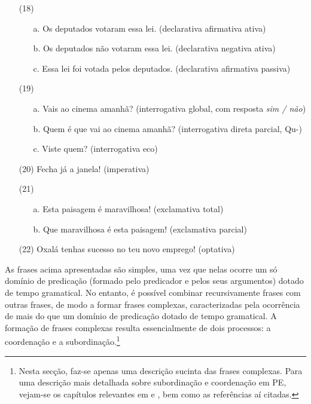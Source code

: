 \documentclass[output=paper,colorlinks,citecolor=brown,booklanguage=portuguese]{langscibook}
\begin{document}
\begin{enumerate}[align=left]
    \item [(18)]
    \begin{enumerate}
        \item [a.] Os deputados votaram essa lei. (declarativa afirmativa ativa)
	\item[b.] Os deputados não votaram essa lei. (declarativa negativa ativa)
	\item[c.] Essa lei foi votada pelos deputados. (declarativa afirmativa passiva)
    \end{enumerate}
    \item[(19)]
    \begin{enumerate}
        \item [a.] Vais ao cinema amanhã? (interrogativa global, com resposta \emph{sim / não})
	\item[b.] Quem é que vai ao cinema amanhã? (interrogativa direta parcial, Qu-)
	\item[c.] Viste quem? (interrogativa eco)
    \end{enumerate}
    \item[(20)]  Fecha já a janela! (imperativa)
    \end{enumerate}
    \begin{enumerate}[align=left]
    \item[(21)]
    \begin{enumerate}
        \item [a.] Esta paisagem é maravilhosa! (exclamativa total)
	\item[b.] Que maravilhosa é esta paisagem! (exclamativa parcial)
    \end{enumerate}
    \item[(22)] Oxalá tenhas sucesso no teu novo emprego! (optativa)
\end{enumerate}

As frases acima apresentadas são simples, uma vez que nelas ocorre um só domínio de predicação (formado pelo predicador e pelos seus argumentos) dotado de tempo gramatical. No entanto, é possível combinar recursivamente frases com outras frases, de modo a formar frases complexas, caracterizadas pela ocorrência de mais do que um domínio de predicação dotado de tempo gramatical. A formação de frases complexas resulta essencialmente de dois processos: a coordenação e a subordinação.\footnote{Nesta secção, faz-se apenas uma descrição sucinta das frases complexas. Para uma descrição mais detalhada sobre subordinação e coordenação em PE, vejam-se os capítulos relevantes em \citet{Mateus2003} e \citet{Raposo2013}, bem como as referências aí citadas.}
\end{document}
